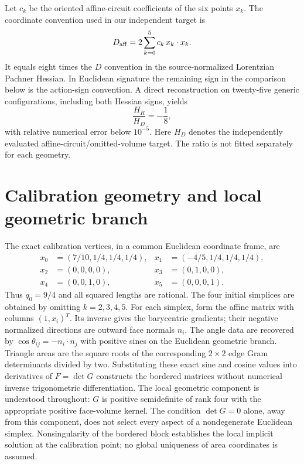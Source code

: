 \documentclass[11pt]{article}
\theoremstyle{definition}
\theoremstyle{remark}
\begin{document}
Let $c_k$ be the oriented affine-circuit coefficients of the six points $x_k$.  The coordinate convention used in our independent target is
\begin{equation}
 D_{\rm aff}=2\sum_{k=0}^{5}c_k\,x_k\mathbin{\cdot}x_k.
 \label{eq:Daff}
\end{equation}
It equals eight times the $D$ convention in the source-normalized Lorentzian Pachner Hessian.  In Euclidean signature the remaining sign in the comparison below is the action-sign convention.  A direct reconstruction on twenty-five generic configurations, including both Hessian signs, yields
\begin{equation}
 \frac{H_R}{H_D}=-\frac18,
 \label{eq:eighthnumeric}
\end{equation}
with relative numerical error below $10^{-5}$.  Here $H_D$ denotes the independently evaluated affine-circuit/omitted-volume target.  The ratio is not fitted separately for each geometry.

\section{Calibration geometry and local geometric branch}
The exact calibration vertices, in a common Euclidean coordinate frame, are
\begin{align}
 x_0&=(7/10,1/4,1/4,1/4),&x_1&=(-4/5,1/4,1/4,1/4),\\
 x_2&=(0,0,0,0),&x_3&=(0,1,0,0),\\
 x_4&=(0,0,1,0),&x_5&=(0,0,0,1).
\end{align}
Thus $q_0=9/4$ and all squared lengths are rational.
The four initial simplices are obtained by omitting $k=2,3,4,5$.
For each simplex, form the affine matrix with columns $(1,x_i)^T$.
Its inverse gives the barycentric gradients; their negative normalized directions are outward face normals $n_i$.
The angle data are recovered by $\cos\theta_{ij}=-n_i\cdot n_j$ with positive sines on the Euclidean geometric branch.
Triangle areas are the square roots of the corresponding $2\times2$ edge Gram determinants divided by two.
Substituting these exact sine and cosine values into derivatives of $F=\det G$ constructs the bordered matrices without numerical inverse trigonometric differentiation.
The local geometric component is understood throughout: $G$ is positive semidefinite of rank four with the appropriate positive face-volume kernel.
The condition $\det G=0$ alone, away from this component, does not select every aspect of a nondegenerate Euclidean simplex.
Nonsingularity of the bordered block establishes the local implicit solution at the calibration point; no global uniqueness of area coordinates is assumed.
\end{document}
